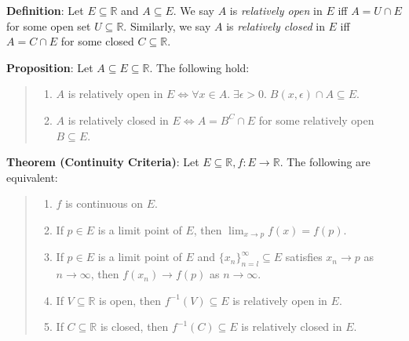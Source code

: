 \documentclass[11pt]{article}
\begin{document}
\textbf{Definition}: Let $E \subseteq \mathbb{R}$ and $A \subseteq E$. We say $A$ is \emph{relatively open} in $E$ iff $A = U \cap E$ for some open set $U \subseteq \mathbb{R}$. Similarly, we say $A$ is \emph{relatively closed} in $E$ iff $A = C \cap E$ for some closed $C \subseteq \mathbb{R}$.

\textbf{Proposition}: Let $A \subseteq E \subseteq \mathbb{R}$. The following hold:
\begin{quote}\vspace{-0.3cm}
	\begin{enumerate}
	\item $A$ is relatively open in $E \iff \forall x \in A.\; \exists \epsilon > 0.\; B(x, \epsilon) \cap A \subseteq E$.
	\item $A$ is relatively closed in $E \iff A = B^C \cap E$ for some relatively open $B \subseteq E$.
	\end{enumerate}
\end{quote}

\textbf{Theorem (Continuity Criteria)}: Let $E \subseteq \mathbb{R}, f : E \to \mathbb{R}$. The following are equivalent:
\begin{quote}\vspace{-0.3cm}
	\begin{enumerate}
	\item $f$ is continuous on $E$.
	\item If $p \in E$ is a limit point of $E$, then $\lim_{x \to p} f(x) = f(p)$.
	\item If $p \in E$ is a limit point of $E$ and $\{x_n\}_{n=l}^\infty \subseteq E$ satisfies $x_n \to p$ as $n \to \infty$, then $f(x_n) \to f(p)$ as $n \to \infty$.
	\item If $V \subseteq \mathbb{R}$ is open, then $f^{-1}(V) \subseteq E$ is relatively open in $E$.
	\item If $C \subseteq \mathbb{R}$ is closed, then $f^{-1}(C) \subseteq E$ is relatively closed in $E$.
	\end{enumerate}
\end{quote}
\end{document}
